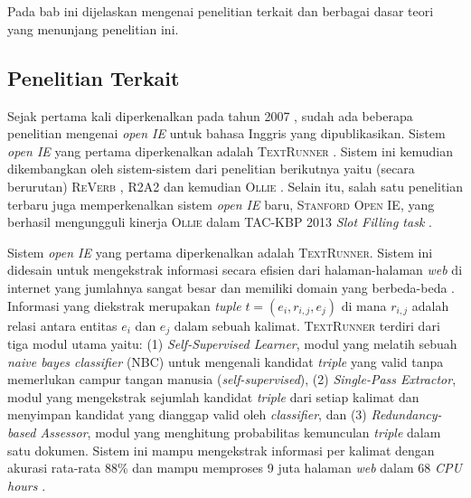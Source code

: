 \chapter{\babDua}
\label{chap:babDua}
Pada bab ini dijelaskan mengenai penelitian terkait dan berbagai dasar teori yang menunjang penelitian ini.

\section{Penelitian Terkait}

Sejak pertama kali diperkenalkan pada tahun 2007 \citep{banko2007open}, sudah ada beberapa penelitian mengenai \textit{open IE} untuk bahasa Inggris yang dipublikasikan. Sistem \textit{open IE} yang pertama diperkenalkan adalah \textsc{TextRunner} \citep{banko2007open}. Sistem ini kemudian dikembangkan oleh sistem-sistem dari penelitian berikutnya yaitu (secara berurutan) \textsc{ReVerb} \citep{fader2011identifying}, \textsc{R2A2} \citep{etzioni2011open} dan kemudian \textsc{Ollie} \citep{schmitz2012open}	. Selain itu, salah satu penelitian terbaru juga memperkenalkan sistem \textit{open IE} baru, \textsc{Stanford Open IE}, yang berhasil mengungguli kinerja \textsc{Ollie} dalam TAC-KBP 2013 \textit{Slot Filling task} \citep{angeli2015leveraging}.

Sistem \textit{open IE} yang pertama diperkenalkan adalah \textsc{TextRunner}. Sistem ini didesain untuk mengekstrak informasi secara efisien dari halaman-halaman \textit{web} di internet yang jumlahnya sangat besar dan memiliki domain yang berbeda-beda \citep{banko2007open}. Informasi yang diekstrak merupakan \textit{tuple} $t = (e_i, r_{i,j}, e_j)$ di mana $r_{i,j}$ adalah relasi antara entitas $e_i$ dan $e_j$ dalam sebuah kalimat. \textsc{TextRunner} terdiri dari tiga modul utama \citep{banko2007open} yaitu: (1) \textit{Self-Supervised Learner}, modul yang melatih sebuah \textit{naive bayes classifier} (NBC) untuk mengenali kandidat \textit{triple} yang valid tanpa memerlukan campur tangan manusia (\textit{self-supervised}), (2) \textit{Single-Pass Extractor}, modul yang mengekstrak sejumlah kandidat \textit{triple} dari setiap kalimat dan menyimpan kandidat yang dianggap valid oleh \textit{classifier}, dan (3) \textit{Redundancy-based Assessor}, modul yang menghitung probabilitas kemunculan \textit{triple} dalam satu dokumen. Sistem ini mampu mengekstrak informasi per kalimat dengan akurasi rata-rata 88\% dan mampu memproses 9 juta halaman \textit{web} dalam 68 \textit{CPU hours} \citep{banko2007open}.

